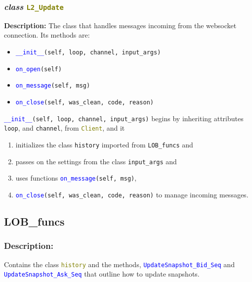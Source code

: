 \subsubsection{\textit{class} \textcolor{olive}{\texttt{L2\_Update}} }
\noindent\textbf{Description:} The class that handles messages incoming from the websocket connection. Its methods are:
\begin{itemize}[noitemsep]
	\item \textcolor{blue}{\texttt{\_\_init\_\_}}\texttt{(self, loop, channel, input\_args)}
	\item
	\textcolor{blue}{\texttt{on\_open}}\texttt{(self)}
	\item \textcolor{blue}{\texttt{on\_message}}\texttt{(self, msg)}
	\item \textcolor{blue}{\texttt{on\_close}}\texttt{(self, was\_clean, code, reason)}
\end{itemize}

\textcolor{blue}{\texttt{\_\_init\_\_}}\texttt{(self, loop, channel, input\_args)} begins by inheriting attributes \texttt{loop}, and \texttt{channel}, from \textcolor{olive}{\texttt{Client}}, and it
\begin{enumerate}[noitemsep]
	\item initializes the class \texttt{history} imported from \texttt{LOB\_funcs} and
	\item passes on the settings from the class \texttt{input\_args} and \item uses functions \textcolor{blue}{\texttt{on\_message}}\texttt{(self, msg)},
	\item \textcolor{blue}{\texttt{on\_close}}\texttt{(self, was\_clean, code, reason)} to manage incoming messages.
\end{enumerate} 
\cleardoublepage

\cleardoublepage

\cleardoublepage

\cleardoublepage


\cleardoublepage


\subsection{LOB\_funcs}
\subsubsection{\textbf{Description:}}Contains the class \textcolor{olive}{\texttt{history}} and the methods, \textcolor{blue}{\texttt{UpdateSnapshot\_Bid\_Seq}} and 
\textcolor{blue}{\texttt{UpdateSnapshot\_Ask\_Seq}} that outline how to update snapshots.



